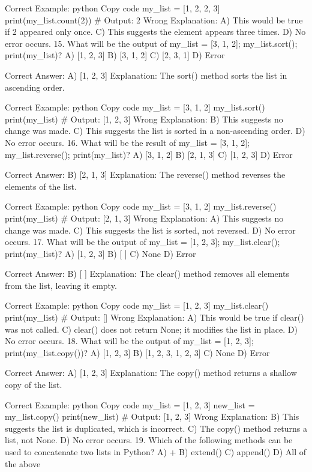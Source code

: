 Correct Example:
python
Copy code
my_list = [1, 2, 2, 3]
print(my_list.count(2))  # Output: 2
Wrong Explanation:
A) This would be true if 2 appeared only once.
C) This suggests the element appears three times.
D) No error occurs.
15. What will be the output of my_list = [3, 1, 2]; my_list.sort(); print(my_list)?
A) [1, 2, 3]
B) [3, 1, 2]
C) [2, 3, 1]
D) Error

Correct Answer: A) [1, 2, 3]
Explanation: The sort() method sorts the list in ascending order.

Correct Example:
python
Copy code
my_list = [3, 1, 2]
my_list.sort()
print(my_list)  # Output: [1, 2, 3]
Wrong Explanation:
B) This suggests no change was made.
C) This suggests the list is sorted in a non-ascending order.
D) No error occurs.
16. What will be the result of my_list = [3, 1, 2]; my_list.reverse(); print(my_list)?
A) [3, 1, 2]
B) [2, 1, 3]
C) [1, 2, 3]
D) Error

Correct Answer: B) [2, 1, 3]
Explanation: The reverse() method reverses the elements of the list.

Correct Example:
python
Copy code
my_list = [3, 1, 2]
my_list.reverse()
print(my_list)  # Output: [2, 1, 3]
Wrong Explanation:
A) This suggests no change was made.
C) This suggests the list is sorted, not reversed.
D) No error occurs.
17. What will be the output of my_list = [1, 2, 3]; my_list.clear(); print(my_list)?
A) [1, 2, 3]
B) [ ]
C) None
D) Error

Correct Answer: B) [ ]
Explanation: The clear() method removes all elements from the list, leaving it empty.

Correct Example:
python
Copy code
my_list = [1, 2, 3]
my_list.clear()
print(my_list)  # Output: []
Wrong Explanation:
A) This would be true if clear() was not called.
C) clear() does not return None; it modifies the list in place.
D) No error occurs.
18. What will be the output of my_list = [1, 2, 3]; print(my_list.copy())?
A) [1, 2, 3]
B) [1, 2, 3, 1, 2, 3]
C) None
D) Error

Correct Answer: A) [1, 2, 3]
Explanation: The copy() method returns a shallow copy of the list.

Correct Example:
python
Copy code
my_list = [1, 2, 3]
new_list = my_list.copy()
print(new_list)  # Output: [1, 2, 3]
Wrong Explanation:
B) This suggests the list is duplicated, which is incorrect.
C) The copy() method returns a list, not None.
D) No error occurs.
19. Which of the following methods can be used to concatenate two lists in Python?
A) +
B) extend()
C) append()
D) All of the above

